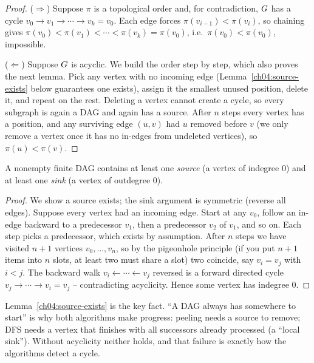 \begin{proof}
($\Rightarrow$) Suppose $\pi$ is a topological order and, for contradiction, $G$ has a cycle
$v_0\to v_1\to\cdots\to v_k=v_0$. Each edge forces $\pi(v_{i-1})<\pi(v_i)$, so chaining gives
$\pi(v_0)<\pi(v_1)<\cdots<\pi(v_k)=\pi(v_0)$, i.e.\ $\pi(v_0)<\pi(v_0)$, impossible.

($\Leftarrow$) Suppose $G$ is acyclic. We build the order step by step, which also proves the next
lemma. Pick any vertex with no incoming edge (Lemma~\ref{ch04:source-exists} below guarantees one
exists), assign it the smallest unused position, delete it, and repeat on the rest. Deleting a
vertex cannot create a cycle, so every subgraph is again a DAG and again has a source. After $n$
steps every vertex has a position, and any surviving edge $(u,v)$ had $u$ removed before $v$ (we only
remove a vertex once it has no in-edges from undeleted vertices), so $\pi(u)<\pi(v)$.
\end{proof}

\begin{lemma}\label{ch04:source-exists}
A nonempty finite DAG contains at least one \emph{source} (a vertex of indegree $0$) and at least one
\emph{sink} (a vertex of outdegree $0$).
\end{lemma}

\begin{proof}
We show a source exists; the sink argument is symmetric (reverse all edges). Suppose every vertex had
an incoming edge. Start at any $v_0$, follow an in-edge backward to a predecessor $v_1$, then a
predecessor $v_2$ of $v_1$, and so on. Each step picks a predecessor, which exists by assumption.
After $n$ steps we have visited $n+1$ vertices $v_0,\dots,v_n$, so by the pigeonhole principle (if you put $n+1$ items into $n$ slots, at least two must share a slot) two coincide, say
$v_i=v_j$ with $i<j$. The backward walk $v_i\leftarrow\cdots\leftarrow v_j$ reversed is a forward
directed cycle $v_j\to\cdots\to v_i=v_j$ -- contradicting acyclicity. Hence some vertex has indegree
$0$.
\end{proof}

\begin{whybox}
Lemma~\ref{ch04:source-exists} is the key fact. ``A DAG always has somewhere to start'' is
why both algorithms make progress: peeling needs a source to remove; DFS needs a vertex that finishes
with all successors already processed (a ``local sink''). Without acyclicity neither holds, and that
failure is exactly how the algorithms detect a cycle.
\end{whybox}

